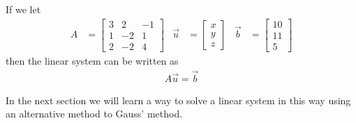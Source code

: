 If we let
\begin{align*}
	A & =
\begin{bmatrix}
3 & 2 & -1 \\ 1 & -2 & 1 \\ 2 & -2 & 4
\end{bmatrix} & \vec{u} & =\begin{bmatrix}
x \\ y \\ z
\end{bmatrix} & \vec{b} & = \begin{bmatrix}
10 \\ 11 \\ 5
\end{bmatrix}
\end{align*}
then the linear system can be written as
%
\begin{align*}
	A\vec{u}=\vec{b}
\end{align*}

In the next section we will learn a way to solve a linear system in this way using an alternative method to Gauss' method.


%
%
%
%




